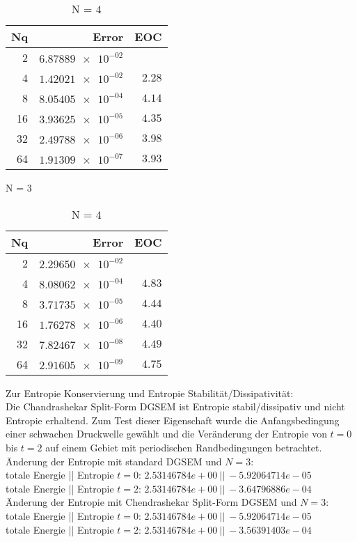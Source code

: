 \documentclass[11pt]{scrartcl}
\begin{document}
\begin{table}[H]
\parbox{.45\linewidth}{
\centering
    \begin{tabular}{|r|r|r|}
    \hline\hline
    \textbf{Nq} & \textbf{Error} & \textbf{EOC} \\\hline
    2 & $\num{6.87889e-02}$ & $\num{}$ \\
    4 & $\num{1.42021e-02}$ & $\num{2.28}$ \\
    8 & $\num{8.05405e-04}$ & $\num{4.14}$ \\
    16 & $\num{3.93625e-05}$ & $\num{4.35}$ \\
    32 & $\num{2.49788e-06}$ & $\num{3.98}$ \\
    64 & $\num{1.91309e-07}$ & $\num{3.93}$ \\\hline\hline
  \end{tabular} 
  \caption{N = $3$}
  }
  \parbox{.45\linewidth}{
	\centering
    \begin{tabular}{|r|r|r|}
    \hline\hline
    \textbf{Nq} & \textbf{Error} & \textbf{EOC} \\\hline
    2 & $\num{2.29650e-02}$ & $\num{}$ \\
    4 & $\num{8.08062e-04}$ & $\num{4.83}$ \\
    8 & $\num{3.71735e-05}$ & $\num{4.44}$ \\
    16 & $\num{1.76278e-06}$ & $\num{4.40}$ \\
    32 & $\num{7.82467e-08}$ & $\num{4.49}$ \\
    64 & $\num{2.91605e-09}$ & $\num{4.75}$ \\\hline\hline
  \end{tabular}
   \caption{N = $4$}
  }
\end{table}
Zur Entropie Konservierung und Entropie Stabilität/Dissipativität: \\
Die Chandrashekar Split-Form DGSEM ist Entropie stabil/dissipativ und nicht Entropie erhaltend. 
Zum Test dieser Eigenschaft wurde die Anfangsbedingung einer schwachen Druckwelle gewählt und die Veränderung der Entropie von $t=0$ bis $t=2$ auf einem Gebiet mit periodischen Randbedingungen betrachtet.\\
Änderung der Entropie mit standard DGSEM und $N=3$: \\
totale Energie || Entropie $t=0$: $2.53146784e+00 \ || \ -5.92064714e-05$\\
totale Energie || Entropie $t=2$: $2.53146784e+00 \ || \ -3.64796886e-04$ \\
Änderung der Entropie mit Chendrashekar Split-Form DGSEM und $N=3$: \\
totale Energie || Entropie $t=0$: $2.53146784e+00 \ || \ -5.92064714e-05$\\
totale Energie || Entropie $t=2$: $2.53146784e+00 \ || \ -3.56391403e-04$ \\
\end{document}
